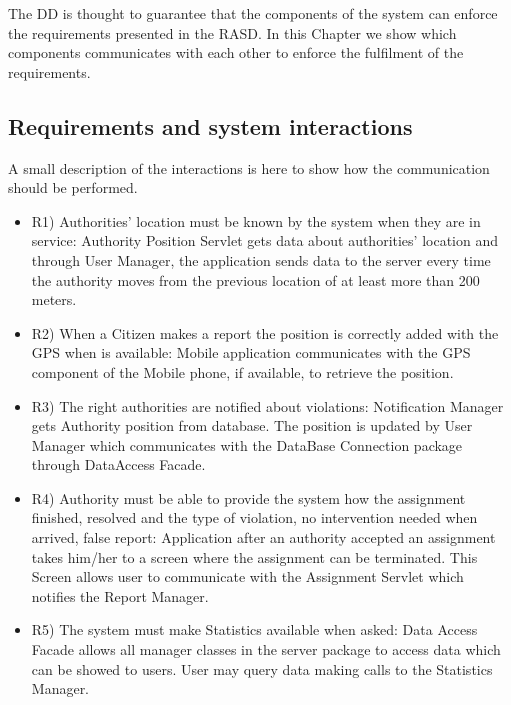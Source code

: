 The DD is thought to guarantee that the components of the system can enforce the requirements presented in the RASD.
\newline
In this Chapter we show which components communicates with each other to enforce the fulfilment of
the requirements.
\subsection{Requirements and system interactions}
A small description of the interactions is here to show how the communication should be performed.
\begin{itemize}
\item R1) Authorities’ location must be known by the system when they are in service: Authority Position
Servlet gets data about authorities’ location and through User Manager, the application sends
data to the server every time the authority moves from the previous location of at least more than
200 meters.

\item R2) When a Citizen makes a report the position is correctly added with the GPS when is available:
Mobile application communicates with the GPS component of the Mobile phone, if available, to
retrieve the position.

\item R3) The right authorities are notified about violations: Notification Manager gets Authority position
from database. The position is updated by User Manager which communicates with the
DataBase Connection package through DataAccess Facade.

\item R4) Authority must be able to provide the system how the assignment finished, resolved and the
type of violation, no intervention needed when arrived, false report: Application after an authority
accepted an assignment takes him/her to a screen where the assignment can be terminated.
This Screen allows user to communicate with the Assignment Servlet which notifies the Report
Manager.

\item R5) The system must make Statistics available when asked: Data Access Facade allows all manager
classes in the server package to access data which can be showed to users. User may query data
making calls to the Statistics Manager.


\end{itemize}
